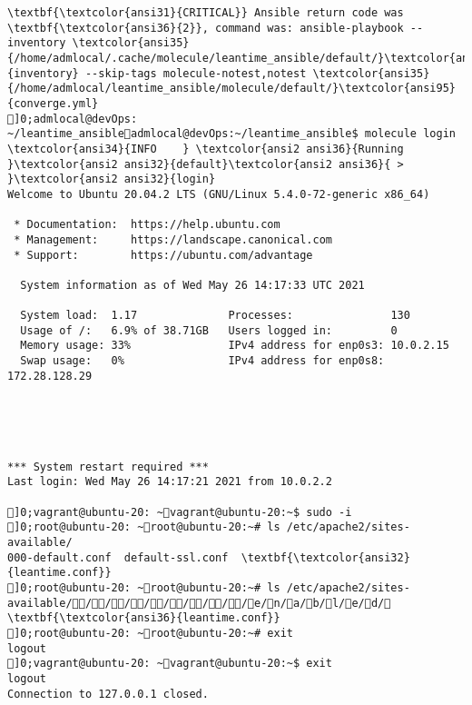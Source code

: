 \documentclass{scrartcl}
\begin{document}
\begin{Verbatim}
\textbf{\textcolor{ansi31}{CRITICAL}} Ansible return code was \textbf{\textcolor{ansi36}{2}}, command was: ansible-playbook --inventory \textcolor{ansi35}{/home/admlocal/.cache/molecule/leantime_ansible/default/}\textcolor{ansi95}{inventory} --skip-tags molecule-notest,notest \textcolor{ansi35}{/home/admlocal/leantime_ansible/molecule/default/}\textcolor{ansi95}{converge.yml}
]0;admlocal@devOps: ~/leantime_ansibleadmlocal@devOps:~/leantime_ansible$ molecule login
\textcolor{ansi34}{INFO    } \textcolor{ansi2 ansi36}{Running }\textcolor{ansi2 ansi32}{default}\textcolor{ansi2 ansi36}{ > }\textcolor{ansi2 ansi32}{login}
Welcome to Ubuntu 20.04.2 LTS (GNU/Linux 5.4.0-72-generic x86_64)

 * Documentation:  https://help.ubuntu.com
 * Management:     https://landscape.canonical.com
 * Support:        https://ubuntu.com/advantage

  System information as of Wed May 26 14:17:33 UTC 2021

  System load:  1.17              Processes:               130
  Usage of /:   6.9% of 38.71GB   Users logged in:         0
  Memory usage: 33%               IPv4 address for enp0s3: 10.0.2.15
  Swap usage:   0%                IPv4 address for enp0s8: 172.28.128.29





*** System restart required ***
Last login: Wed May 26 14:17:21 2021 from 10.0.2.2

]0;vagrant@ubuntu-20: ~vagrant@ubuntu-20:~$ sudo -i
]0;root@ubuntu-20: ~root@ubuntu-20:~# ls /etc/apache2/sites-available/
000-default.conf  default-ssl.conf  \textbf{\textcolor{ansi32}{leantime.conf}}
]0;root@ubuntu-20: ~root@ubuntu-20:~# ls /etc/apache2/sites-available//////////e/n/a/b/l/e/d/
\textbf{\textcolor{ansi36}{leantime.conf}}
]0;root@ubuntu-20: ~root@ubuntu-20:~# exit
logout
]0;vagrant@ubuntu-20: ~vagrant@ubuntu-20:~$ exit
logout
Connection to 127.0.0.1 closed.


\end{Verbatim}
\end{document}
